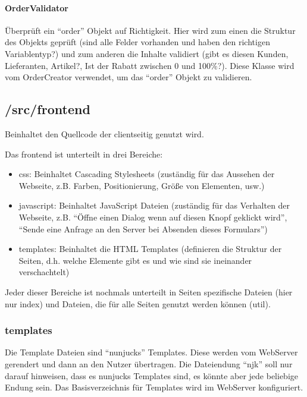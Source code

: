 \documentclass[12pt,pdftex,parskip=half]{scrartcl}
\begin{document}
        \paragraph{OrderValidator}
        Überprüft ein ``order'' Objekt auf Richtigkeit. Hier wird zum einen die Struktur des Objekts geprüft (sind alle Felder vorhanden und haben den richtigen Variablentyp?) und zum anderen die Inhalte validiert (gibt es diesen Kunden, Lieferanten, Artikel?, Ist der Rabatt zwischen 0 und 100\%?).
        Diese Klasse wird vom OrderCreator verwendet, um das ``order'' Objekt zu validieren.


        \newpage


        \subsection{/src/frontend}
        Beinhaltet den Quellcode der clientseitig genutzt wird.

        Das frontend ist unterteilt in drei Bereiche:

        \begin{itemize}
            \item css: Beinhaltet Cascading Stylesheets (zuständig für das Aussehen der Webseite, z.B. Farben, Positionierung, Größe von Elementen, usw.)
            \item javascript: Beinhaltet JavaScript Dateien (zuständig für das Verhalten der Webseite, z.B. "`Öffne einen Dialog wenn auf diesen Knopf geklickt wird"', "`Sende eine Anfrage an den Server bei Absenden dieses Formulars"')
            \item templates: Beinhaltet die HTML Templates (definieren die Struktur der Seiten, d.h. welche Elemente gibt es und wie sind sie ineinander verschachtelt)
        \end{itemize}

        Jeder dieser Bereiche ist nochmals unterteilt in Seiten spezifische Dateien (hier nur index) und Dateien, die für alle Seiten genutzt werden können (util).


        \newpage


        \subsubsection{templates}
        Die Template Dateien sind "`nunjucks"' Templates. Diese werden vom WebServer gerendert und dann an den Nutzer übertragen.
        Die Dateiendung "`njk"' soll nur darauf hinweisen, dass es nunjucks Templates sind, es könnte aber jede beliebige Endung sein.
        Das Basisverzeichnis für Templates wird im WebServer konfiguriert.
\end{document}

